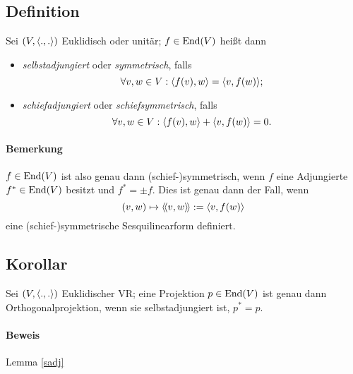 \subsection{Definition}
\begin{Definition}
	Sei $ (V,\langle .,. \rangle) $ Euklidisch oder unitär; $ f\in \operatorname{End}(V) $ heißt dann
		\begin{itemize}
			\item \emph{selbstadjungiert} oder \emph{symmetrisch}, falls
				\[ \forall v,w\in V: \langle f(v),w \rangle = \langle v,f(w) \rangle; \]
			\item \emph{schiefadjungiert} oder \emph{schiefsymmetrisch}, falls
				\[ \forall v,w\in V: \langle f(v),w \rangle + \langle v,f(w) \rangle = 0. \]
		\end{itemize}
\end{Definition}
\paragraph{Bemerkung}
	$ f\in \operatorname{End}(V) $ ist also genau dann (schief-)symmetrisch, wenn $ f $ eine Adjungierte $ f^* \in \operatorname{End}(V)$ besitzt und $ f^* = \pm f $. Dies ist genau dann der Fall, wenn
		\[ (v,w)\mapsto \langle\! \langle v,w \rangle\! \rangle := \langle v,f(w) \rangle \]
	eine (schief-)symmetrische Sesquilinearform definiert.

\subsection{Korollar}
\begin{Korollar}[]
	Sei $ (V,\langle .,. \rangle) $ Euklidischer VR; eine Projektion $ p\in \operatorname{End}(V) $ ist genau dann Orthogonalprojektion, wenn sie selbstadjungiert ist, $ p^* = p $.
\end{Korollar}
\paragraph{Beweis}
	Lemma \ref{sadj}